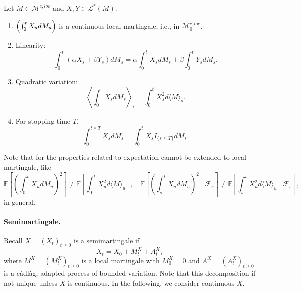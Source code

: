 \begin{thm}
    Let $M \in \mathcal{M}^{c,loc}$ and $X,Y \in \mathcal{L}^*(M)$.
    \begin{enumerate}[label=(\arabic{*})]
        \item $\left(\int_0^t X_udM_u\right)$ is a continuous local martingale, i.e., in  $\mathcal{M}^{c,loc}_0$.
        \item Linearity:
        \begin{equation*}
            \int_0^t\left(\alpha X_s+\beta Y_s\right) d M_s=\alpha \int_0^t X_s d M_s+\beta \int_0^t Y_s d M_s.
        \end{equation*}
        \item Quadratic variation:
        \begin{equation*}
            \left\langle\int_0 X_s d M_s\right\rangle_t=\int_0^t X_s^2 d\langle M\rangle_s.
        \end{equation*}
        \item For stopping time $T$,
        \begin{equation*}
            \int_0^{t \wedge T} X_s d M_s=\int_0^t X_s I_{\{s \leq T\}} d M_s.
        \end{equation*}
    \end{enumerate}
\end{thm}
\begin{rmk}
    Note that for the properties related to expectation cannot be extended to local martingale, like
    \begin{equation*}
        \mathbb{E}\left[\left(\int_0^t X_u d M_u\right)^2\right]\neq \mathbb{E}\left[\int_0^t X_u^2 d\langle M\rangle_u\right],\quad \mathbb{E}\left[\left(\int_s^t X_u d M_u\right)^2 \mid \mathcal{F}_s\right] \neq \mathbb{E}\left[\int_s^t X_u^2 d\langle M\rangle_u \mid \mathcal{F}_s\right],
    \end{equation*}
    in general.
\end{rmk}

\paragraph{Semimartingale.} Recall $X = (X_t)_{t \geq 0}$ is a semimartingale if
\begin{equation*}
    X_t = X_0 + M_t^X + A_t^X,
\end{equation*}
where $M^X = (M_t^X)_{t \geq 0}$ is a local martingale with $M_0^X = 0$ and $A^X = (A_t^X)_{t \geq 0}$ is a c\`adl\`ag, adapted process of bounded variation. Note that this decomposition if not unique unless $X$ is continuous. In the following, we consider continuous $X$.

